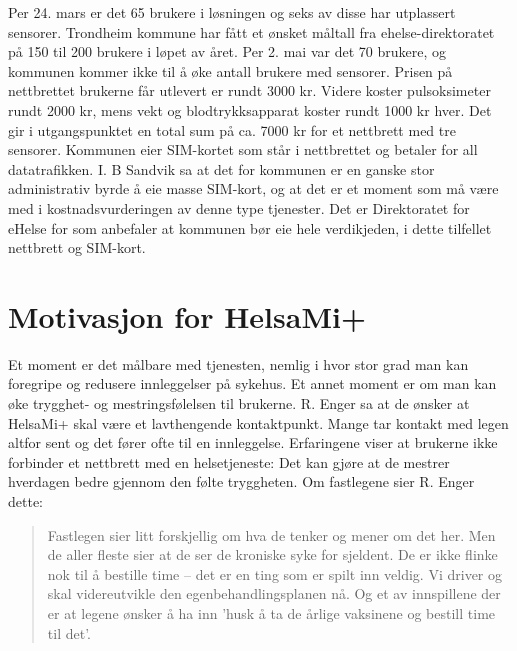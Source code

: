 Per 24. mars er det 65 brukere i løsningen og seks av disse har utplassert sensorer. Trondheim kommune har fått et ønsket måltall fra
ehelse-direktoratet på 150 til 200 brukere i løpet av året. Per 2. mai var det 70 brukere, og kommunen kommer ikke til å øke antall
brukere med sensorer.
Prisen på nettbrettet brukerne får utlevert er rundt 3000 kr. Videre koster
pulsoksimeter rundt 2000 kr, mens vekt og blodtrykksapparat koster rundt 1000 kr hver. Det gir i utgangspunktet en total sum på ca. 7000 kr
for et nettbrett med tre sensorer. Kommunen eier SIM-kortet som står i nettbrettet og betaler for all datatrafikken. I. B Sandvik sa at
det for kommunen er en ganske stor administrativ byrde å eie masse SIM-kort, og at det er et moment som må være med i kostnadsvurderingen
av denne type tjenester. Det er Direktoratet for eHelse for som anbefaler at kommunen bør eie hele verdikjeden, i dette tilfellet nettbrett
og SIM-kort.

\section{Motivasjon for HelsaMi+}
Et moment er det målbare med tjenesten, nemlig i hvor stor grad man kan foregripe og redusere innleggelser på sykehus. Et annet moment er om man kan
øke trygghet- og mestringsfølelsen til brukerne. R. Enger sa at de ønsker at HelsaMi+ skal være et lavthengende kontaktpunkt. Mange tar kontakt
med legen altfor sent og det fører ofte til en innleggelse. Erfaringene viser at brukerne ikke forbinder et nettbrett med en
helsetjeneste:  Det kan gjøre at de mestrer
hverdagen bedre gjennom den følte tryggheten. Om fastlegene sier R. Enger dette: \blockquote{Fastlegen sier litt forskjellig om hva de tenker og mener
om det her. Men de aller fleste sier at de ser de kroniske syke for sjeldent. De er ikke flinke nok til å bestille time -- det
er en ting som er spilt inn veldig. Vi driver og skal videreutvikle den
egenbehandlingsplanen nå. Og et av innspillene der er at legene ønsker å ha inn 'husk å ta de årlige vaksinene og bestill time til det'.}

